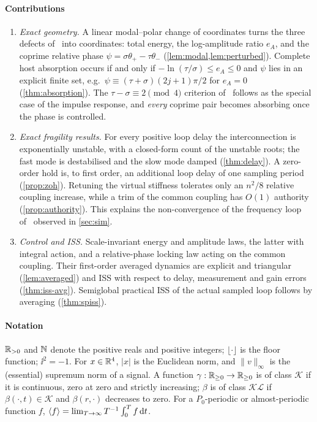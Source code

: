 \paragraph*{Contributions}
\begin{enumerate}
\item \emph{Exact geometry.} A linear modal--polar change of coordinates turns
  the three defects of~\citet{juchem2027restoring} into coordinates: total
  energy, the log-amplitude ratio $e_A$, and the coprime relative phase
  $\psi=\sigma\theta_+-\tau\theta_-$
  (\cref{lem:modal,lem:perturbed}).
  Complete host absorption occurs if and only if
  $-\ln(\tau/\sigma)\le e_A\le0$ and $\psi$ lies in an explicit finite set,
  e.g.\ $\psi\equiv(\tau+\sigma)(2j+1)\pi/2$ for $e_A=0$
  (\cref{thm:absorption}).
  The $\tau-\sigma\equiv2\pmod4$ criterion of~\citet{juchem2026shaping} follows
  as the special case of the impulse response, and \emph{every} coprime pair
  becomes absorbing once the phase is controlled.
\item \emph{Exact fragility results.} For every positive loop delay the
  interconnection is exponentially unstable, with a closed-form count of the
  unstable roots; the fast mode is destabilised and the slow mode damped
  (\cref{thm:delay}).
  A zero-order hold is, to first order, an additional loop delay of one sampling
  period (\cref{prop:zoh}).
  Retuning the virtual stiffness tolerates only an $n^2/8$ relative coupling
  increase, while a trim of the common coupling has $O(1)$ authority
  (\cref{prop:authority}).
  This explains the non-convergence of the frequency loop
  of~\citet{juchem2027restoring} observed in \cref{sec:sim}.
\item \emph{Control and ISS.} Scale-invariant energy and amplitude laws, the
  latter with integral action, and a relative-phase locking law acting on the
  common coupling.
  Their first-order averaged dynamics are explicit and triangular
  (\cref{lem:averaged}) and ISS with respect to delay, measurement and gain
  errors (\cref{thm:iss-avg}).
  Semiglobal practical ISS of the actual sampled loop follows by averaging
  (\cref{thm:spiss}).
\end{enumerate}

\paragraph*{Notation}
$\mathbb{R}_{>0}$ and $\mathbb{N}$ denote the positive reals and positive integers;
$\lfloor\cdot\rfloor$ is the floor function; $\ii^2=-1$.
For $x\in\mathbb{R}^4$, $|x|$ is the Euclidean norm, and $\|v\|_\infty$ is the
(essential) supremum norm of a signal.
A function $\gamma:\mathbb{R}_{\ge0}\to\mathbb{R}_{\ge0}$ is of class $\mathcal K$ if it is
continuous, zero at zero and strictly increasing; $\beta$ is of class
$\mathcal{KL}$ if $\beta(\cdot,t)\in\mathcal K$ and $\beta(r,\cdot)$ decreases
to zero.
For a $P_0$-periodic or almost-periodic function $f$,
$\langle f\rangle=\lim_{T\to\infty}T^{-1}\int_0^Tf\,\mathrm{d} t$.

